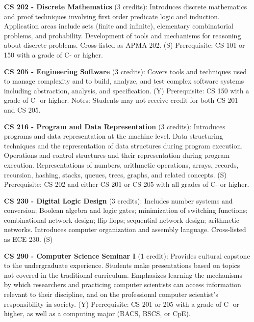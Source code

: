 \documentclass[12pt,twoside]{article}
\begin{document}

{\bf\noindent CS 202 - Discrete Mathematics} (3 credits): Introduces
discrete mathematics and proof techniques involving first order
predicate logic and induction. Application areas include sets (finite
and infinite), elementary combinatorial problems, and
probability. Development of tools and mechanisms for reasoning about
discrete problems. Cross-listed as APMA 202. (S) Prerequisite: CS 101
or 150 with a grade of C- or higher.
      
{\bf\noindent CS 205 - Engineering Software} (3 credits): Covers tools
and techniques used to manage complexity and to build, analyze, and
test complex software systems including abstraction, analysis, and
specification. (Y) Prerequisite: CS 150 with a grade of C- or higher.
Notes: Students may not receive credit for both CS 201 and CS 205.
      
{\bf\noindent CS 216 - Program and Data Representation} (3 credits):
Introduces programs and data representation at the machine level. Data
structuring techniques and the representation of data structures
during program execution. Operations and control structures and their
representation during program execution. Representations of numbers,
arithmetic operations, arrays, records, recursion, hashing, stacks,
queues, trees, graphs, and related concepts. (S) Prerequisite: CS 202
and either CS 201 or CS 205 with all grades of C- or higher.

{\bf\noindent CS 230 - Digital Logic Design} (3 credits): Includes
number systems and conversion; Boolean algebra and logic gates;
minimization of switching functions; combinational network design;
flip-flops; sequential network design; arithmetic networks. Introduces
computer organization and assembly language. Cross-listed as ECE
230. (S)
      
{\bf\noindent CS 290 - Computer Science Seminar I} (1 credit):
Provides cultural capstone to the undergraduate experience. Students
make presentations based on topics not covered in the traditional
curriculum. Emphasizes learning the mechanisms by which researchers
and practicing computer scientists can access information relevant to
their discipline, and on the professional computer scientist's
responsibility in society. (Y) Prerequisite: CS 201 or 205 with a
grade of C- or higher, as well as a computing major (BACS, BSCS, or
CpE).
\end{document}
